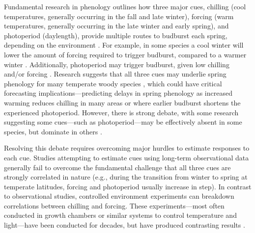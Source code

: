 \documentclass{article}
\begin{document}
\par Fundamental research in phenology outlines how three major cues, chilling (cool temperatures, generally occurring in the fall and late winter), forcing (warm temperatures, generally occurring in the late winter and early spring), and photoperiod (daylength), provide multiple routes to budburst 
each spring, depending on the environment \citep{chuineJTB}. For example, in some species a cool winter will lower the amount of forcing required to trigger budburst, compared to a warmer winter \citep{harrington2015}. Additionally, photoperiod may trigger budburst, given low chilling and/or forcing \citep{Basler:2014aa, Caffarra:2011b, zohner2016}. Research suggests that all three cues may underlie spring phenology for many temperate woody species \citep{flynn2018,Basler:2014aa,Caffarra:2011qf}, which could have critical forecasting implications---predicting delays in spring phenology as increased warming reduces chilling in many areas \citep{fraga2019} or where earlier budburst shortens the experienced photoperiod. However, there is strong debate, with some research suggesting some cues---such as photoperiod---may be effectively absent in some species, but dominate in others \citep{zohner2016,koerner2010a}. 

\par Resolving this debate requires overcoming major hurdles to estimate responses to each cue. Studies attempting to estimate cues using long-term observational data \citep[e.g.,][]{vitasse2013, zohner2016} generally fail to overcome the fundamental challenge that all three cues are strongly correlated in nature (e.g., during the transition from winter to spring at temperate latitudes, forcing and photoperiod usually increase in step). In contrast to observational studies, controlled environment experiments can breakdown correlations between chilling and forcing. These experiments---most often conducted in growth chambers or similar systems to control temperature and light---have been conducted for decades, but have produced contrasting results \citep{zohner2016,Laube:2014a,Basler:2012,Caffarra:2011b,Caffarra:2011a}. 

\end{document}
